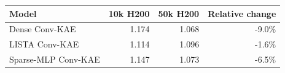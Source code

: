 \begin{tabular}{lrrr}
\toprule
Model & 10k H200 & 50k H200 & Relative change \\
\midrule
Dense Conv-KAE & 1.174 & 1.068 & -9.0\% \\
LISTA Conv-KAE & 1.114 & 1.096 & -1.6\% \\
Sparse-MLP Conv-KAE & 1.147 & 1.073 & -6.5\% \\
\bottomrule
\end{tabular}
